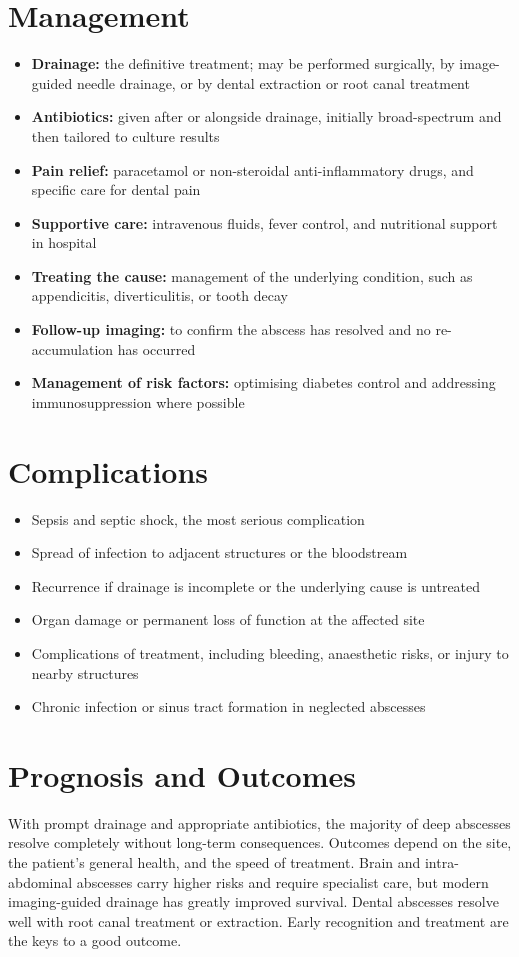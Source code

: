\section*{Management}
\begin{itemize}
    \item \textbf{Drainage:} the definitive treatment; may be performed surgically, by image-guided needle drainage, or by dental extraction or root canal treatment
    \item \textbf{Antibiotics:} given after or alongside drainage, initially broad-spectrum and then tailored to culture results
    \item \textbf{Pain relief:} paracetamol or non-steroidal anti-inflammatory drugs, and specific care for dental pain
    \item \textbf{Supportive care:} intravenous fluids, fever control, and nutritional support in hospital
    \item \textbf{Treating the cause:} management of the underlying condition, such as appendicitis, diverticulitis, or tooth decay
    \item \textbf{Follow-up imaging:} to confirm the abscess has resolved and no re-accumulation has occurred
    \item \textbf{Management of risk factors:} optimising diabetes control and addressing immunosuppression where possible
\end{itemize}

\section*{Complications}
\begin{itemize}
    \item Sepsis and septic shock, the most serious complication
    \item Spread of infection to adjacent structures or the bloodstream
    \item Recurrence if drainage is incomplete or the underlying cause is untreated
    \item Organ damage or permanent loss of function at the affected site
    \item Complications of treatment, including bleeding, anaesthetic risks, or injury to nearby structures
    \item Chronic infection or sinus tract formation in neglected abscesses
\end{itemize}

\section*{Prognosis and Outcomes}
With prompt drainage and appropriate antibiotics, the majority of deep abscesses resolve completely without long-term consequences. Outcomes depend on the site, the patient's general health, and the speed of treatment. Brain and intra-abdominal abscesses carry higher risks and require specialist care, but modern imaging-guided drainage has greatly improved survival. Dental abscesses resolve well with root canal treatment or extraction. Early recognition and treatment are the keys to a good outcome.

